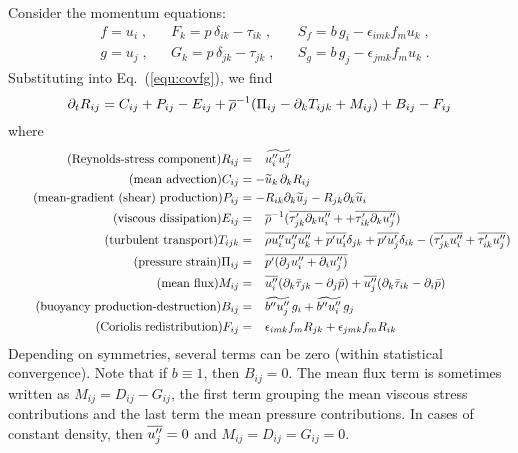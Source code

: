 Consider the momentum equations:
\begin{align}
  &f = u_i\;, && F_k=p\,\delta_{ik}-\tau_{ik}\;, && S_f = b\, g_i- \epsilon_{imk} f_m u_k\;,\\
  &g = u_j\;, && G_k=p\,\delta_{jk}-\tau_{jk}\;, && S_g = b\, g_j- \epsilon_{jmk} f_m u_k\;.
\end{align}
Substituting into Eq.~(\ref{equ:covfg}), we find
\begin{equation}\label{equ:Rij}
  \pt{R_{ij}}{t}  = C_{ij}  +P_{ij} -E_{ij}
  +\avr{\rho}^{-1} ( \Pi_{ij} - \pt{T_{ijk}}{k} + M_{ij} ) +B_{ij} -F_{ij}
\end{equation}
where
\begin{align}
  \tag{Reynolds-stress component}
    R_{ij}  &=\phantom{-}\avf{u_i''u_j''}\\
  \tag{mean advection}
    C_{ij}  &=-\avf{u}_k\,\pt{R_{ij}}{k}\\
  \tag{mean-gradient (shear) production}
    P_{ij}  &=-R_{ik} \pt{\avf{u}_j}{k} -R_{jk} \pt{\avf{u}_i}{k} \\
  \tag{viscous dissipation}
    E_{ij}  &=\phantom{-} \avr{\rho}^{-1} ( \avr{\tau'_{jk} \pt{u''_i}{k}} +
                                           +\avr{\tau'_{ik} \pt{u''_j}{k}} )\\
  \tag{turbulent transport}
    T_{ijk} &=\phantom{-} \avr{\rho u''_i u''_j u''_k}
                         +\avr{p'u'_i}\delta_{jk} +\avr{p'u'_j}\delta_{ik}
                         -( \avr{\tau'_{jk} u''_i} +\avr{\tau'_{ik} u''_j} )\\
  \tag{pressure strain}
    \Pi_{ij}&=\phantom{-} \avr{ p' ( \pt{u''_i}{j}+ \pt{u''_j}{i} ) }\\
  \tag{mean flux}
    M_{ij}  &=\phantom{-} \avr{u''_i} ( \pt{\bar{\tau}_{jk}}{k} - \pt{\bar{p}}{j} )
                         +\avr{u''_j} ( \pt{\bar{\tau}_{ik}}{k} - \pt{\bar{p}}{i} )\\
  \tag{buoyancy production-destruction}
    B_{ij}  &=\phantom{-} \avf{b''u''_j}\,g_i+\avf{b''u''_i}\,g_j \\
  \tag{Coriolis redistribution}
    F_{ij}  &=\phantom{-} \epsilon_{imk}f_m R_{jk} +\epsilon_{jmk}f_m R_{ik}
\end{align}
Depending on symmetries, several terms can be zero (within statistical convergence). Note that if $b\equiv 1$, then $B_{ij}=0$. The mean flux term is sometimes written as $M_{ij}=D_{ij}-G_{ij}$, the first term grouping the mean viscous stress contributions and the last term the mean pressure contributions. In cases of constant density, then $\avr{u''_j}=0$ and $M_{ij}=D_{ij}=G_{ij}=0$.

